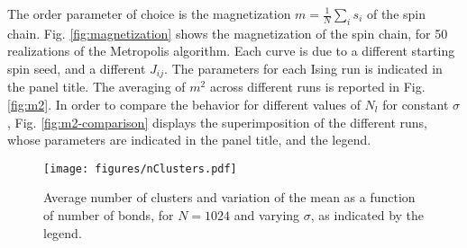 The order parameter of choice is the magnetization $m = \frac{1}{N}\sum_i s_i $ of the spin chain. Fig. \ref{fig:magnetization} shows the magnetization of the spin chain, for 50 realizations of the Metropolis algorithm. Each curve is due to a different starting spin seed, and a different $J_{ij}$. The parameters for each Ising run is indicated in the panel title. The averaging of $m^2$ across different runs is reported in Fig. \ref{fig:m2}. In order to compare the behavior for different values of  $N_l$ for constant $\sigma$, Fig. \ref{fig:m2-comparison} displays the superimposition of the different runs, whose parameters are indicated in the panel title, and the legend.

\begin{figure}
	\centering
	\texttt{[image: figures/nClusters.pdf]}
	\caption{Average number of clusters and variation of the mean as a function of number of bonds, for $N=1024$ and varying $\sigma$, as indicated by the legend.}
	\label{fig:nClusters}
\end{figure}

